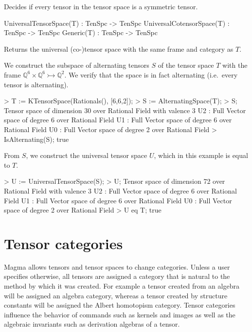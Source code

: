 Decides if every tensor in the tensor space is a symmetric tensor.

\begin{intrinsics}
UniversalTensorSpace(T) : TenSpc -> TenSpc
UniversalCotensorSpace(T) : TenSpc -> TenSpc
Generic(T) : TenSpc -> TenSpc
\end{intrinsics}

Returns the universal (co-)tensor space with the same frame and category as $T$.

\begin{example}[UniversalConst]

We construct the subspace of alternating tensors $S$ of the tensor space $T$ with the frame $\mathbb{Q}^6\times\mathbb{Q}^6\rightarrowtail \mathbb{Q}^2$. 
We verify that the space is in fact alternating (i.e.\ every tensor is alternating).
\begin{code}
> T := KTensorSpace(Rationals(), [6,6,2]);
> S := AlternatingSpace(T);
> S;
Tensor space of dimension 30 over Rational Field with valence 3
U2 : Full Vector space of degree 6 over Rational Field
U1 : Full Vector space of degree 6 over Rational Field
U0 : Full Vector space of degree 2 over Rational Field
> IsAlternating(S);
true
\end{code}

From $S$, we construct the universal tensor space $U$, which in this example is equal to $T$. 
\begin{code}
> U := UniversalTensorSpace(S);
> U;
Tensor space of dimension 72 over Rational Field with valence 3
U2 : Full Vector space of degree 6 over Rational Field
U1 : Full Vector space of degree 6 over Rational Field
U0 : Full Vector space of degree 2 over Rational Field
> U eq T;
true
\end{code}
\end{example}





\chapter{Tensor categories}\label{ch:tensor-categories}

Magma allows tensors and tensor spaces to change categories. 
Unless a user specifies otherwise,
all tensors are assigned a category that is natural to the method
by which it was created.
For example a tensor created from an algebra will be assigned an 
algebra category, whereas a tensor created by structure constants
will be assigned the Albert homotopism category.  Tensor categories influence
the behavior of commands such as kernels and images  
as well as the algebraic invariants such as derivation algebras of a tensor.  

